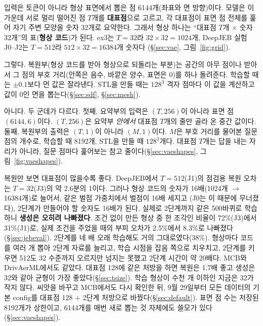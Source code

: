 \documentclass[11pt]{article}
\begin{document}
\begin{description}[leftmargin=0pt, style=nextline, itemsep=5pt]
\item[``VAE 입력이 32토큰? 32채널이 뭐야?'']
입력은 토큰이 아니라 형상 표면에서 뽑은 점 6144개(좌표와 면 방향)이다. 모델은 이 가운데 서로 멀리
떨어진 점 $T$개를 \textbf{대표점}으로 고르고, 각 대표점이 표면 점 전체를 훑어 자기 주변 모양을 숫자
32개로 요약한다. 그래서 형상 하나는 ``대표점 $T$개 $\times$ 숫자 32개''의 표(\textbf{형상 코드})가 된다.
ex3는 $T=32$라 $32\times32=1024$개, DeepJEB 실험 J0--J2는 $T=512$라 $512\times32=16384$개 숫자다
(\S\ref{sec:vae}, 그림~\ref{fig:grid}).
\item[``출력은 임의의 점에서 SDF 값이지?'']
그렇다. 복원부(형상 코드를 받아 형상으로 되돌리는 부분)는 공간의 아무 점이나 받아서 그 점의 부호 거리(안쪽은 음수, 바깥은 양수, 표면은 0)를
하나 돌려준다. 학습할 때는 $\pm0.1$보다 먼 값은 잘라낸다. STL을 만들 때는 $128^3$ 격자 점마다 이 값을
계산하고 값이 0인 면을 뽑는다(\S\ref{sec:sdf}, \S\ref{sec:mesh}).
\item[``그럼 $(T, 256)$ $\rightarrow$ 요약부 $\rightarrow$ 형상 코드 $\rightarrow$ 복원부 $\rightarrow$ $(T, 1)$인가?'']
아니다. 두 군데가 다르다. 첫째, 요약부의 입력은 $(T, 256)$이 아니라 표면 점 $(6144, 6)$이다. $(T, 256)$은 요약부
\emph{안에서} 대표점 $T$개의 줄만 골라 온 중간 값이다. 둘째, 복원부의 출력은 $(T, 1)$이 아니라 $(M, 1)$이다.
$M$은 부호 거리를 물어본 질문 점의 개수로, 학습할 때 8192개, STL을 만들 때 $128^3$개다. 대표점 $T$개는
답을 내는 자리가 아니라, 질문 점마다 훑어보는 참고 줄이다(\S\ref{sec:vaeshapes}, 그림~\ref{fig:vaeshapes}).
\item[``대표점 $T$와 표면 점 수는 무조건 클수록 좋은 것 아닌가?'']
복원만 보면 대표점이 많을수록 좋다. DeepJEB에서 $T=512$(J1)의 점검용 복원 오차는 $T=32$(J3)의 약 2.6분의 1이다.
그러나 형상 코드의 숫자가 16배(1024개 $\rightarrow$ 16384개)로 늘어서, 같은 벌점 가중치에서 벌점이 16배 세지고
(J0는 이 때문에 무너졌다), 2단계가 만들어야 할 숫자도 16배가 된다. 실제로 2단계까지 같은 500바퀴로 학습하니
\textbf{생성은 오히려 나빠졌다}. 조건 없이 만든 형상 중 한 조각인 비율이 72\%(J3)에서 31\%(J1)로, 실제 조건을 주었을 때의
부피 오차가 2.5\%에서 8.3\%로 나빠졌다(\S\ref{sec:jebeval}). 2단계를 네 배 오래 학습해도 거의 그대로였다(38\%).
형상마다 코드를 여러 개 뽑아 2단계 자료를 늘리고, 학습 시점을 잡음 쪽으로 치우치고, 2단계를 키우면 512도 32 수준까지 오르지만
넘지는 못했고 2단계 시간이 약 20배다. MCB와 DrivAerML에서도 같았다. 대표점 128에 같은 처방을 하면 복원은 1.7배 좋고 생성은 32와 같아
균형이 가장 좋았다(\S\ref{sec:tsize}). 학습 형상이 수천 개 이하인 지금은 32가 작지 않다. 씨앗을 바꾸고 MCB에서도 다시 확인한 뒤, 9월 29일부터 모든 데이터의 기본 config를 대표점 128 + 2단계 처방으로 바꿨다(\S\ref{sec:default}). 표면 점 수는 저장된 8192개가 상한이고, 6144개를 매번 새로 뽑는 것 자체에도 쓸모가 있다(\S\ref{sec:vaeshapes}).

\end{description}
\end{document}
